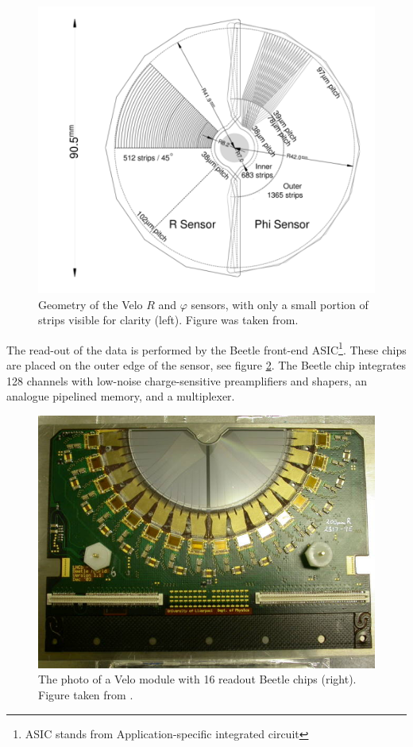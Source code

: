 \begin{figure}[h]
 \begin{center}
  \includegraphics[width=0.8\linewidth]{figures/VeloGeometry.PNG}
   \caption{Geometry of the Velo $R$ and  $\varphi$ sensors, with only a small portion of strips visible for clarity (left). 
   Figure was taken from\cite{lhcb}.  
     \label{fig:velo}}
 \end{center}
\end{figure}

The read-out of the data is performed by the Beetle front-end ASIC\footnote{ASIC stands from Application-specific integrated circuit}\cite{Beetle}. These chips are placed on the outer edge of the sensor, see figure \ref{fig:velo1}. The Beetle chip integrates 128 channels with low-noise charge-sensitive preamplifiers and shapers, an analogue pipelined memory, and a multiplexer.

\begin{figure}[h]
 \begin{center}
   \includegraphics[width=0.6\linewidth]{figures/Velo_photo.jpg}
   \caption{
   The photo of a Velo module with 16 readout Beetle chips (right). 
   Figure taken from \cite{lhcb}.  
     \label{fig:velo1}}
 \end{center}
\end{figure}

